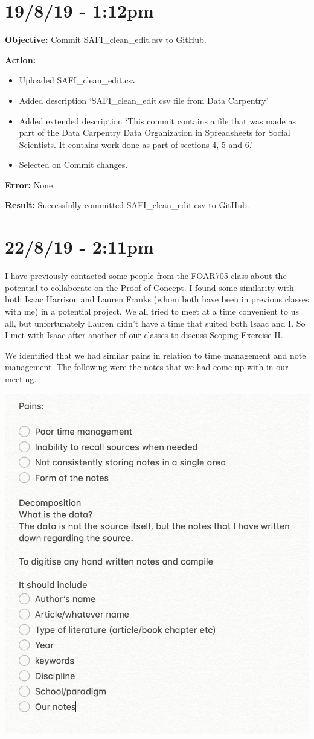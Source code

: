 \documentclass{article}
\begin{document}
\section*{19/8/19 - 1:12pm}

\textbf{Objective:} Commit SAFI\_clean\_edit.csv to GitHub.

\textbf{Action:}
\begin{itemize}
    \item Uploaded SAFI\_clean\_edit.csv
    \item Added description ‘SAFI\_clean\_edit.csv file from Data Carpentry’
    \item Added extended description ‘This commit contains a file that was made as part of the Data Carpentry Data Organization in Spreadsheets for Social Scientists. It contains work done as part of sections 4, 5 and 6.’
    \item Selected on Commit changes.
\end{itemize}

\textbf{Error:} None.

\textbf{Result:} Successfully committed SAFI\_clean\_edit.csv to GitHub.

\section*{22/8/19 - 2:11pm}

I have previously contacted some people from the FOAR705 class about the potential to collaborate on the Proof of Concept. I found some similarity with both Isaac Harrison and Lauren Franks (whom both have been in previous classes with me) in a potential project. We all tried to meet at a time convenient to us all, but unfortunately Lauren didn’t have a time that suited both Isaac and I. So I met with Isaac after another of our classes to discuss Scoping Exercise II. 

We identified that we had similar pains in relation to time management and note management. The following were the notes that we had come up with in our meeting.

\includegraphics[width=\textwidth]{figh.png}
\end{document}

